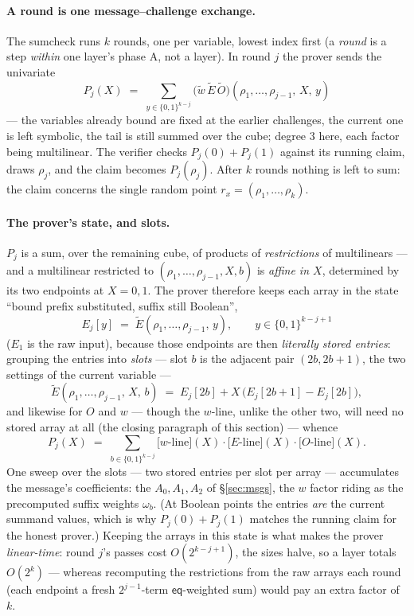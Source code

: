 \documentclass[11pt]{article}
\newcommand{\bits}{\{0,1\}}
\newcommand{\mle}[1]{\widetilde{#1}}
\newcommand{\eq}{\mathsf{eq}}
\theoremstyle{definition}
\begin{document}
\paragraph{A round is one message--challenge exchange.}
The sumcheck runs $k$ rounds, one per variable, lowest index first
(a \emph{round} is a step \emph{within} one layer's phase A, not a
layer).  In round $j$ the prover sends the univariate
\[
  P_j(X) \;=\; \sum_{y \in \bits^{k-j}}
    \big(\mle{w}\,\mle{E}\,\mle{O}\big)
    (\rho_1, \dots, \rho_{j-1},\, X,\, y)
\]
--- the variables already bound are fixed at the earlier challenges, the
current one is left symbolic, the tail is still summed over the cube;
degree $3$ here, each factor being multilinear.  The verifier checks
$P_j(0) + P_j(1)$ against its running claim, draws $\rho_j$, and the
claim becomes $P_j(\rho_j)$.  After $k$ rounds nothing is left to sum:
the claim concerns the single random point
$r_x = (\rho_1, \dots, \rho_k)$.

\paragraph{The prover's state, and slots.}
$P_j$ is a sum, over the remaining cube, of products of
\emph{restrictions} of multilinears --- and a multilinear restricted to
$(\rho_1, \dots, \rho_{j-1}, X, b)$ is \emph{affine in $X$}, determined
by its two endpoints at $X = 0, 1$.  The prover therefore keeps each
array in the state ``bound prefix substituted, suffix still Boolean'',
\[
  E_j[y] \;=\; \mle{E}(\rho_1, \dots, \rho_{j-1},\, y),
  \qquad y \in \bits^{k-j+1}
\]
($E_1$ is the raw input), because those endpoints are then
\emph{literally stored entries}: grouping the entries into \emph{slots}
--- slot $b$ is the adjacent pair $(2b, 2b{+}1)$, the two settings of
the current variable ---
\[
  \mle{E}(\rho_1, \dots, \rho_{j-1},\, X,\, b)
  \;=\; E_j[2b] + X\,\big(E_j[2b{+}1] - E_j[2b]\big),
\]
and likewise for $O$ and $w$ --- though the $w$-line, unlike the other
two, will need no stored array at all (the closing paragraph of this
section) --- whence
\[
  P_j(X) \;=\; \sum_{b \in \bits^{k-j}}
    \big[\text{$w$-line}\big](X)\cdot
    \big[\text{$E$-line}\big](X)\cdot
    \big[\text{$O$-line}\big](X).
\]
One sweep over the slots --- two stored entries per slot per array ---
accumulates the message's coefficients: the $A_0, A_1, A_2$ of
\S\ref{sec:msgs}, the $w$ factor riding as the precomputed suffix
weights $\omega_b$.  (At Boolean points the entries \emph{are} the
current summand values, which is why $P_j(0) + P_j(1)$ matches the
running claim for the honest prover.)  Keeping the arrays in this state
is what makes the prover \emph{linear-time}: round $j$'s passes cost
$O(2^{k-j+1})$, the sizes halve, so a layer totals $O(2^k)$ ---
whereas recomputing the restrictions from the raw arrays each round
(each endpoint a fresh $2^{j-1}$-term $\eq$-weighted sum) would pay an
extra factor of $k$.
\end{document}
